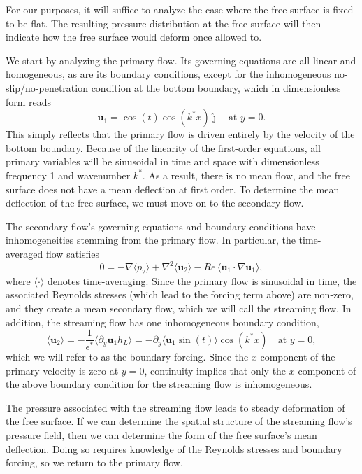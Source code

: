 \documentclass[letter,11pt]{article}
\begin{document}
For our purposes, it will suffice to analyze the case where the free surface is fixed to be flat. The resulting pressure distribution at the free surface will then indicate how the free surface would deform once allowed to. 

We start by analyzing the primary flow. Its governing equations are all linear and homogeneous, as are its boundary conditions, except for the inhomogeneous no-slip/no-penetration condition at the bottom boundary, which in dimensionless form reads
\begin{equation}
    \mathbf{u}_1 = \cos(t)\cos(k^* x) \hat\jmath \quad \text{at } y = 0.
\end{equation}
This simply reflects that the primary flow is driven entirely by the velocity of the bottom boundary. Because of the linearity of the first-order equations, all primary variables will be sinusoidal in time and space with dimensionless frequency 1 and wavenumber $k^*$. As a result, there is no mean flow, and the free surface does not have a mean deflection at first order. To determine the mean deflection of the free surface, we must move on to the secondary flow. 

The secondary flow's governing equations and boundary conditions have inhomogeneities stemming from the primary flow. In particular, the time-averaged flow satisfies
\begin{equation}
    0 = -\nabla\langle p_2 \rangle + \nabla^2\langle \mathbf{u}_2\rangle - Re\,\langle \mathbf{u}_1 \cdot \nabla \mathbf{u}_1\rangle,
\end{equation}
where $\langle\cdot\rangle$ denotes time-averaging. Since the primary flow is sinusoidal in time, the associated Reynolds stresses (which lead to the forcing term above) are non-zero, and they create a mean secondary flow, which we will call the streaming flow. In addition, the streaming flow has one inhomogeneous boundary condition,
\begin{equation}
    \langle \mathbf{u}_2 \rangle = -\frac{1}{\epsilon^*}\langle \partial_y \mathbf{u}_1 h_L\rangle = -\partial_y \langle \mathbf{u}_1 \sin(t) \rangle \cos(k^* x) \quad \text{at } y=0,
\end{equation}
which we will refer to as the boundary forcing. Since the $x$-component of the primary velocity is zero at $y=0$, continuity implies that only the $x$-component of the above boundary condition for the streaming flow is inhomogeneous. 

The pressure associated with the streaming flow leads to steady deformation of the free surface. If we can determine the spatial structure of the streaming flow's pressure field, then we can determine the form of the free surface's mean deflection. Doing so requires knowledge of the Reynolds stresses and boundary forcing, so we return to the primary flow. 
\end{document}
